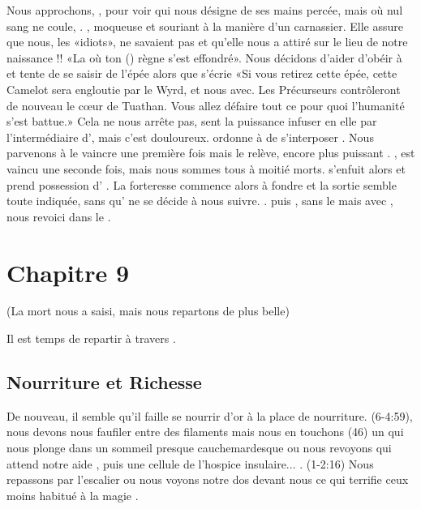 \documentclass[11pt]{article}
\begin{document}
Nous approchons, , pour voir \arthur{} qui nous désigne de ses mains percée, mais où nul sang ne coule, \excalibur{}. \morgane{}, moqueuse et souriant à la manière d'un carnassier. Elle assure que nous, les «idiots», ne savaient pas et qu'elle nous a attiré sur le lieu de notre naissance !! «La où ton (\arthur{}) règne s'est effondré». Nous décidons d'aider d'obéir à \arthur{} et \ailei{} tente de se saisir de l'épée  alors que \morgane{} s'écrie «Si vous retirez cette épée, cette Camelot sera engloutie par le Wyrd, et nous avec. Les Précurseurs contrôleront de nouveau le c\oe{}ur de Tuathan. Vous allez défaire tout ce pour quoi l'humanité s'est battue.» Cela ne nous arrête pas,  \ailei{} sent la puissance infuser en elle par l'intermédiaire d'\excalibur{}, mais c'est douloureux. \morgane{} ordonne à \gaheris{} de s'interposer . Nous parvenons à le vaincre une première fois mais \morgane{} le relève, encore plus puissant . , \gaheris{} est vaincu une seconde fois, mais nous sommes tous à moitié morts.  \morgane{} s'enfuit alors et \ailei{} prend possession d'\excalibur{} . La forteresse commence alors à fondre et la sortie semble toute indiquée, sans qu'\arthur{} ne se décide à nous suivre. .  puis , sans le \graal{} mais avec \excalibur{}, nous revoici dans le \coeurtuathan{}.

\section{Chapitre 9}

(La mort nous a saisi, mais nous repartons de plus belle)

Il est temps de repartir à travers \tuathan{}.

\subsection{Nourriture et Richesse}
De nouveau, il semble qu'il faille se nourrir d'or à la place de nourriture. (6-4:59), nous devons nous faufiler entre des filaments mais nous en touchons (46) un qui nous plonge dans un sommeil presque cauchemardesque ou nous revoyons \cuanacht{} qui attend notre aide \gain{\terror[2]}, puis une cellule de l'hospice insulaire... . (1-2:16) Nous repassons par l'escalier ou nous voyons notre dos devant nous ce qui terrifie ceux moins habitué à la magie .
\end{document}
